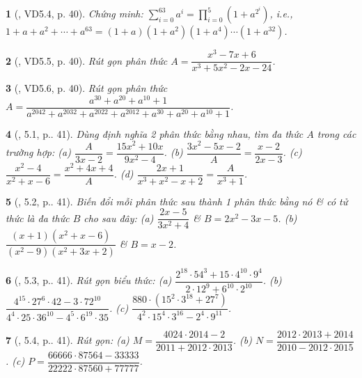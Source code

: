 \documentclass{article}
\newtheorem{baitoan}{}
\begin{document}
\begin{baitoan}[\cite{TLCT_THCS_Toan_8_dai_so}, VD5.4, p. 40]
	Chứng minh: $\sum_{i=0}^{63} a^i = \prod_{i=0}^{5} (1 + a^{2^i})$, i.e., $1 + a + a^2 + \cdots + a^{63} = (1 + a)(1 + a^2)(1 + a^4)\cdots(1 + a^{32})$.
\end{baitoan}

\begin{baitoan}[\cite{TLCT_THCS_Toan_8_dai_so}, VD5.5, p. 40]
	Rút gọn phân thức $A = \dfrac{x^3 - 7x + 6}{x^3 + 5x^2 - 2x - 24}$.
\end{baitoan}

\begin{baitoan}[\cite{TLCT_THCS_Toan_8_dai_so}, VD5.6, p. 40]
	Rút gọn phân thức $A = \dfrac{a^{30} + a^{20} + a^{10} + 1}{a^{2042} + a^{2032} + a^{2022} + a^{2012} + a^{30} + a^{20} + a^{10} + 1}$.
\end{baitoan}

\begin{baitoan}[\cite{TLCT_THCS_Toan_8_dai_so}, 5.1, p.. 41]
	Dùng định nghĩa 2 phân thức bằng nhau, tìm đa thức $A$ trong các trường hợp: (a) $\dfrac{A}{3x - 2} = \dfrac{15x^2 + 10x}{9x^2 - 4}$. (b) $\dfrac{3x^2 - 5x - 2}{A} = \dfrac{x - 2}{2x - 3}$. (c) $\dfrac{x^2 - 4}{x^2 + x - 6} = \dfrac{x^2 + 4x + 4}{A}$. (d) $\dfrac{2x + 1}{x^3 + x^2 - x + 2} = \dfrac{A}{x^3 + 1}$.
\end{baitoan}

\begin{baitoan}[\cite{TLCT_THCS_Toan_8_dai_so}, 5.2, p.. 41]
	Biến đổi mỗi phân thức sau thành 1 phân thức bằng nó \& có tử thức là đa thức $B$ cho sau đây: (a) $\dfrac{2x - 5}{3x^2 + 4}$ \& $B = 2x^2 - 3x - 5$. (b) $\dfrac{(x + 1)(x^2 + x - 6)}{(x^2 - 9)(x^2 + 3x + 2)}$ \& $B = x - 2$.
\end{baitoan}

\begin{baitoan}[\cite{TLCT_THCS_Toan_8_dai_so}, 5.3, p.. 41]
	Rút gọn biểu thức: (a) $\dfrac{2^{18}\cdot 54^3 + 15\cdot 4^{10}\cdot 9^4}{2\cdot 12^9 + 6^{10}\cdot 2^{10}}$. (b) $\dfrac{4^{15}\cdot 27^6\cdot 42 - 3\cdot 72^{10}}{4^4\cdot 25\cdot 36^{10}  - 4^5\cdot 6^{19}\cdot 35}$. (c) $\dfrac{880\cdot(15^2\cdot 3^{18} + 27^7)}{4^2\cdot 15^4\cdot 3^{16} - 2^4\cdot 9^{11}}$.
\end{baitoan}

\begin{baitoan}[\cite{TLCT_THCS_Toan_8_dai_so}, 5.4, p.. 41]
	Rút gọn: (a) $M = \dfrac{4024\cdot 2014 - 2}{2011 + 2012\cdot 2013}$. (b) $N = \dfrac{2012\cdot 2013 + 2014}{2010 - 2012\cdot 2015}$. (c) $P = \dfrac{66666\cdot 87564 - 33333}{22222\cdot 87560 + 77777}$.
\end{baitoan}
\end{document}
